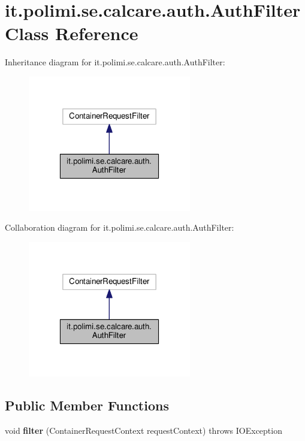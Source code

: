 \hypertarget{classit_1_1polimi_1_1se_1_1calcare_1_1auth_1_1AuthFilter}{}\section{it.\+polimi.\+se.\+calcare.\+auth.\+Auth\+Filter Class Reference}
\label{classit_1_1polimi_1_1se_1_1calcare_1_1auth_1_1AuthFilter}


Inheritance diagram for it.\+polimi.\+se.\+calcare.\+auth.\+Auth\+Filter\+:
\nopagebreak
\begin{figure}[H]
\begin{center}
\leavevmode
\includegraphics[width=202pt]{classit_1_1polimi_1_1se_1_1calcare_1_1auth_1_1AuthFilter__inherit__graph}
\end{center}
\end{figure}


Collaboration diagram for it.\+polimi.\+se.\+calcare.\+auth.\+Auth\+Filter\+:
\nopagebreak
\begin{figure}[H]
\begin{center}
\leavevmode
\includegraphics[width=202pt]{classit_1_1polimi_1_1se_1_1calcare_1_1auth_1_1AuthFilter__coll__graph}
\end{center}
\end{figure}
\subsection*{Public Member Functions}
\begin{DoxyCompactItemize}
\item 
\hypertarget{classit_1_1polimi_1_1se_1_1calcare_1_1auth_1_1AuthFilter_a9666e2671c62689caaa306a18ceb47f0}{}void {\bfseries filter} (Container\+Request\+Context request\+Context)  throws I\+O\+Exception \label{classit_1_1polimi_1_1se_1_1calcare_1_1auth_1_1AuthFilter_a9666e2671c62689caaa306a18ceb47f0}

\end{DoxyCompactItemize}


